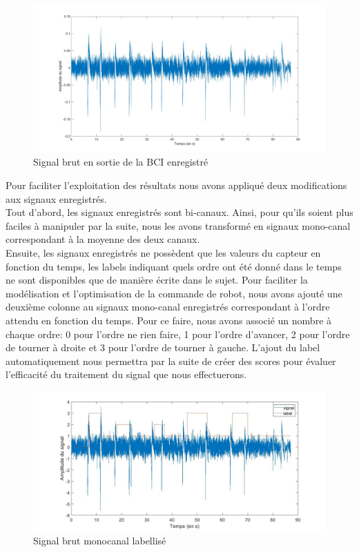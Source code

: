 \documentclass[11pt]{article}
\begin{document}
\begin{figure}[!h]
	\includegraphics[scale=0.25]{images/signalBCIinit.jpg}
	\caption{Signal brut en sortie de la BCI enregistré}
	\label{fig:duck}
\end{figure}

Pour faciliter l'exploitation des résultats nous avons appliqué deux modifications aux signaux enregistrés. \\

Tout d'abord, les signaux enregistrés sont bi-canaux. Ainsi, pour qu'ils soient plus faciles à manipuler par la suite, nous les avons transformé en signaux mono-canal correspondant à la moyenne des deux canaux. \\


Ensuite, les signaux enregistrés ne possèdent que les valeurs du capteur en fonction du temps, les labels indiquant quels ordre ont été donné dans le temps ne sont disponibles que de manière écrite dans le sujet. Pour faciliter la modélisation et l'optimisation de la commande de robot, nous avons ajouté une deuxième colonne au signaux mono-canal enregistrés correspondant à l'ordre attendu en fonction du temps. Pour ce faire, nous avons associé un nombre à chaque ordre: 0 pour l'ordre ne rien faire, 1 pour l'ordre d'avancer, 2 pour l'ordre de tourner à droite et 3 pour l'ordre de tourner à gauche. L'ajout du label automatiquement nous permettra par la suite de créer des scores pour évaluer l'efficacité du traitement du signal que nous effectuerons.

\begin{figure}[!h]
	\includegraphics[scale=0.35]{images/signalBCIlabele.jpg}
	\caption{Signal brut monocanal labellisé}
	\label{fig:duck}
\end{figure}
\end{document}
